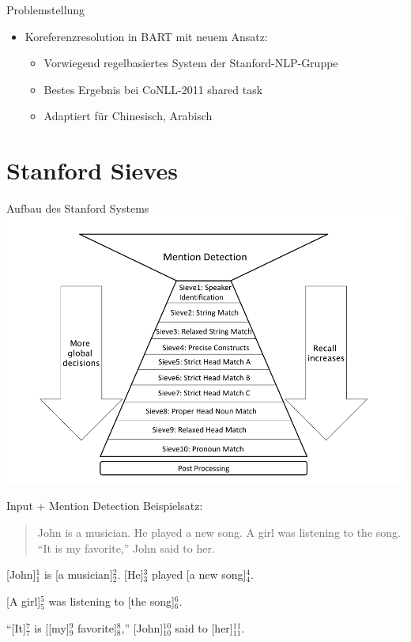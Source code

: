 \documentclass[11pt,a4paper]{beamer}
\begin{document}
\begin{frame}{Problemstellung}
\begin{itemize}
\item Koreferenzresolution in BART mit neuem Ansatz: 
\begin{itemize}
\item Vorwiegend regelbasiertes System der Stanford-NLP-Gruppe
\item Bestes Ergebnis bei CoNLL-2011 shared task
\item Adaptiert für Chinesisch, Arabisch
\end{itemize}
\end{itemize}
\end{frame}

\section{Stanford Sieves}

\begin{frame}{Aufbau des Stanford Systems}
\includegraphics[scale=0.29]{stanford.png}
\end{frame}



\begin{frame}{Input + Mention Detection}
Beispielsatz:
\begin{quote}
John is a musician. He played a new song. A girl was listening to the song. “It is my favorite,” John said to her.
\end{quote} 
\bigskip

[John]$^{1}_{1}$ is [a musician]$^{2}_{2}$. [He]$^{3}_{3}$ played [a new song]$^{4}_{4}$.

[A girl]$^{5}_{5}$ was listening to [the song]$^{6}_{6}$.

“[It]$^{7}_{7}$ is [[my]$^{9}_{9}$ favorite]$^{8}_{8}$,” [John]$^{10}_{10}$ said to [her]$^{11}_{11}$.

\end{frame}
\end{document}
